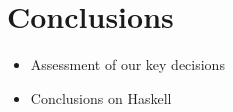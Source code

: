 \section{Conclusions}

\begin{itemize}
\item Assessment of our key decisions
\item Conclusions on Haskell
\end{itemize}
